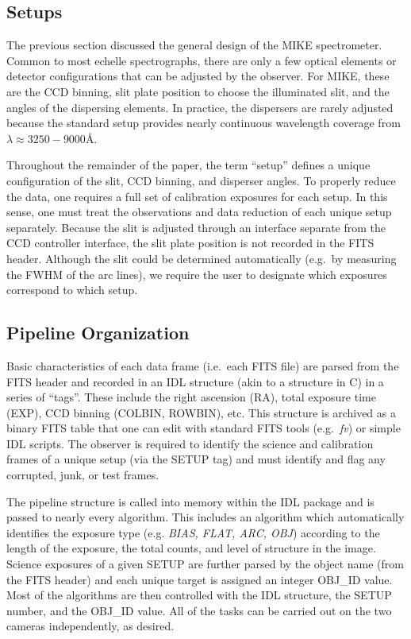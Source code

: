 \documentclass[12pt,preprint]{aastex}
\begin{document}
\subsection{Setups}

The previous section discussed the general design of the
MIKE spectrometer.  Common to most echelle spectrographs,
there are only a few optical elements or detector configurations
that can be adjusted by the observer.  For MIKE, these are the
CCD binning, slit plate position to choose the illuminated slit, 
and the angles of the dispersing elements.
In practice, the dispersers are rarely adjusted
because the standard setup provides nearly continuous wavelength
coverage from $\lambda \approx 3250-9000$\AA.  

Throughout the remainder of the paper, the term ``setup'' defines
a unique configuration of the slit, CCD binning,
and disperser angles.  To properly reduce the data, one requires
a full set of calibration exposures for each setup.  
In this sense, one must treat the observations and data reduction of
each unique setup separately. 
Because the slit is adjusted through an interface separate from the CCD
controller interface, the slit plate position is not
recorded in the FITS header.  Although the slit could be
determined automatically (e.g.\ by measuring the FWHM of the arc lines),
we require the user to designate 
which exposures correspond to which setup.

\subsection{Pipeline Organization}
 
Basic characteristics of each data frame (i.e.\ each FITS file)
are parsed from the FITS header and recorded in an 
IDL structure (akin to a structure in C)
in a series of ``tags''.  These include the right ascension (RA),
total exposure time (EXP), CCD binning 
(COLBIN, ROWBIN), etc.  This structure is archived as a binary FITS table
that one can edit with standard FITS tools (e.g.\ {\it fv})
or simple IDL scripts.  The observer is required to identify the
science and calibration frames of a unique setup (via the SETUP tag)
and must identify and flag any corrupted, junk, or test frames.

The pipeline structure is called into memory within the IDL package
and is passed to nearly every algorithm. 
This includes an algorithm which automatically identifies the 
exposure type (e.g. {\it BIAS, FLAT, ARC, OBJ}) according to the
length of the exposure, the total counts, and
level of structure in the image.
Science exposures of a given SETUP
are further parsed by the object name (from the FITS header) and 
each unique target is assigned an integer OBJ\_ID value. 
Most of the algorithms are then controlled with the
IDL structure, the SETUP number, and the OBJ\_ID value.
All of the tasks can be carried out on the two cameras
independently, as desired.
\end{document}
